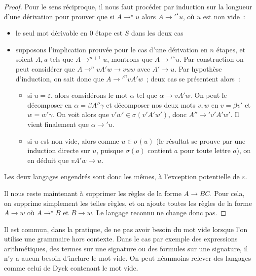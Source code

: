 \begin{proof}
  Pour le sens réciproque, il nous faut procéder par induction sur la longueur
  d'une dérivation pour prouver que si $A \to^\star u$ alors
  $A {\to'}^\star u$, où $u$ est non vide~:
  \begin{itemize}
  \item le seul mot dérivable en $0$ étape est $S$ dans les deux cas
  \item supposons l'implication prouvée pour le cas d'une dérivation en $n$
    étapes, et soient $A,u$ tels que $A \to^{n+1} u$, montrons que
    $A {\to'}^\star u$. Par construction on peut considérer que
    $A \to^n vA'w \to vuw$ avec $A' \to u$. Par hypothèse d'induction, on sait
    donc que $A {\to'}^n vA'w$~; deux cas se présentent alors~:
    \begin{itemize}
    \item si $u = \varepsilon$, alors considérons le mot $\alpha$ tel que
      $\alpha \to vA'w$. On peut le décomposer en $\alpha = \beta A''\gamma$ et
      décomposer nos deux mots $v,w$ en $v = \beta v'$ et $w = w'\gamma$.
      On voit alors que $v'w' \in \sigma(v'A'w')$, donc $A''\to' v'A'w'$. Il
      vient finalement que $\alpha \to' u$.
    \item si $u$ est non vide, alors comme $u \in \sigma(u)$ (le résultat se
      prouve par une induction directe sur $u$, puisque $\sigma(a)$ contient $a$
      pour toute lettre $a$), on en déduit que $vA'w \to u$.
    \end{itemize}
  \end{itemize}

  Les deux langages engendrés sont donc les mêmes, à l'exception potentielle de
  $\varepsilon$.

  Il nous reste maintenant à supprimer les règles de la forme $A \to BC$. Pour
  cela, on supprime simplement les telles règles, et on ajoute toutes les
  règles de la forme $A \to w$ où $A \to^\star B$ et $B \to w$. Le langage
  reconnu ne change donc pas.
\end{proof}

\begin{remark}
  Il est commun, dans la pratique, de ne pas avoir besoin du mot vide lorsque
  l'on utilise une grammaire hors contexte. Dans le cas par exemple des
  expressions arithmétiques, des termes sur une signature ou des formules sur
  une signature, il n'y a aucun besoin d'inclure le mot vide. On peut néanmoins
  relever des langages comme celui de Dyck contenant le mot vide.
\end{remark}

